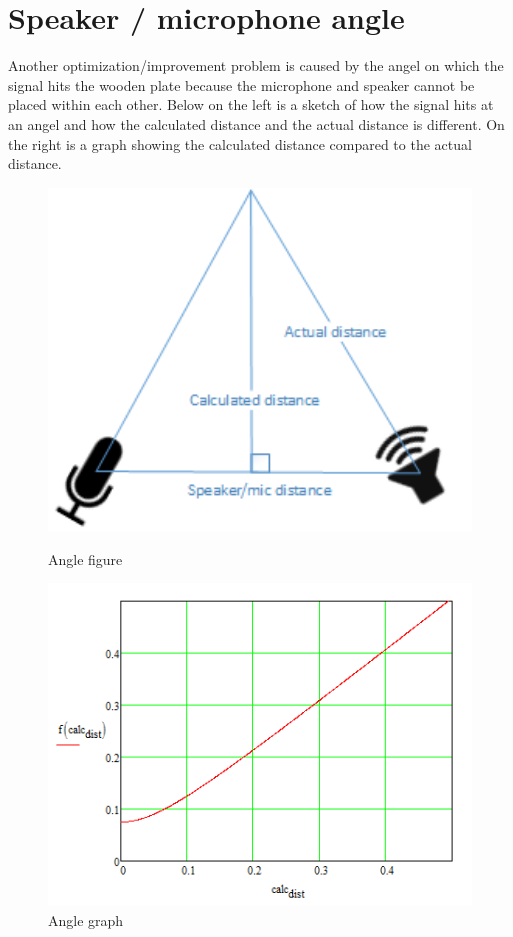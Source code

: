 \section{Speaker / microphone angle}
Another optimization/improvement problem is caused by the angel on which the signal hits the wooden plate because the microphone and speaker cannot be placed within each other. Below on the left is a sketch of how the signal hits at an angel and how the calculated distance and the actual distance is different. On the right is a graph showing the calculated distance compared to the actual distance.
\begin{figure}[H]
\begin{minipage}[b]{0.49\linewidth}
\centering
\includegraphics[width=1\textwidth]{billeder/angle_error}
\caption{Angle figure}
\end{minipage}
\hspace{0.5cm}
\begin{minipage}[b]{0.49\linewidth}
\centering
\includegraphics[width=1\textwidth]{billeder/angle_graph}
\caption{Angle graph}
\end{minipage}
\end{figure}
